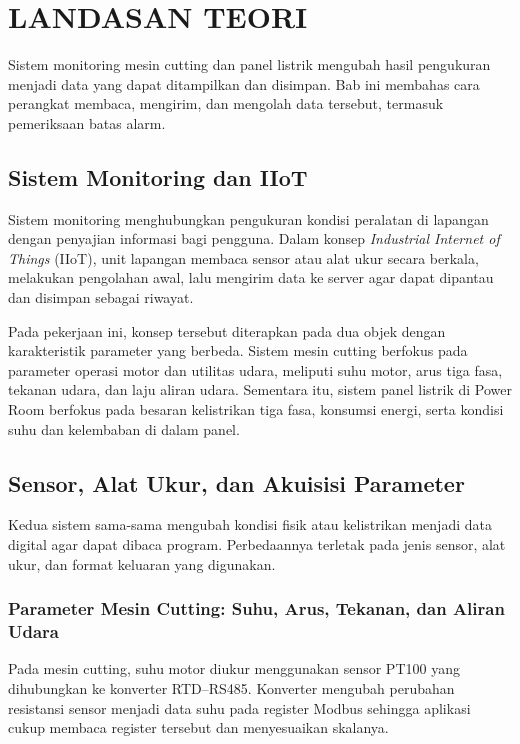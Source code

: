 \chapter{LANDASAN TEORI}

Sistem monitoring mesin cutting dan panel listrik mengubah hasil pengukuran menjadi data yang dapat ditampilkan dan disimpan. Bab ini membahas cara perangkat membaca, mengirim, dan mengolah data tersebut, termasuk pemeriksaan batas alarm.

\section{Sistem Monitoring dan IIoT}

Sistem monitoring menghubungkan pengukuran kondisi peralatan di lapangan dengan penyajian informasi bagi pengguna. Dalam konsep \textit{Industrial Internet of Things} (IIoT), unit lapangan membaca sensor atau alat ukur secara berkala, melakukan pengolahan awal, lalu mengirim data ke server agar dapat dipantau dan disimpan sebagai riwayat.

Pada pekerjaan ini, konsep tersebut diterapkan pada dua objek dengan karakteristik parameter yang berbeda. Sistem mesin cutting berfokus pada parameter operasi motor dan utilitas udara, meliputi suhu motor, arus tiga fasa, tekanan udara, dan laju aliran udara. Sementara itu, sistem panel listrik di Power Room berfokus pada besaran kelistrikan tiga fasa, konsumsi energi, serta kondisi suhu dan kelembaban di dalam panel.

\section{Sensor, Alat Ukur, dan Akuisisi Parameter}

Kedua sistem sama-sama mengubah kondisi fisik atau kelistrikan menjadi data digital agar dapat dibaca program. Perbedaannya terletak pada jenis sensor, alat ukur, dan format keluaran yang digunakan.

\subsection{Parameter Mesin Cutting: Suhu, Arus, Tekanan, dan Aliran Udara}

Pada mesin cutting, suhu motor diukur menggunakan sensor PT100 yang dihubungkan ke konverter RTD--RS485. Konverter mengubah perubahan resistansi sensor menjadi data suhu pada register Modbus sehingga aplikasi cukup membaca register tersebut dan menyesuaikan skalanya.

